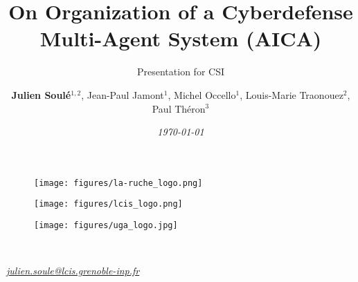 \author{
    \textbf{Julien Soulé}$^{1,2}$, Jean-Paul Jamont$^{1}$, Michel Occello$^{1}$, Louis-Marie Traonouez$^{2}$, Paul Théron$^{3}$
}

\title{\textbf{On Organization of a Cyberdefense Multi-Agent System (AICA)}}

\subtitle{Presentation for CSI}




\date{\textit{\footnotesize \today}}

\begin{frame}[plain]
    \maketitle\vspace{-0.8cm}
    \begin{figure}[ht!]
        \centering

        \centering
        \begin{minipage}{0.25\textwidth}
            \centering
            
        \end{minipage}\hfill
        \begin{minipage}{0.25\textwidth}
            \centering
            \texttt{[image: figures/la-ruche\_logo.png]}
        \end{minipage}\hfill
        \begin{minipage}{0.25\textwidth}
            \centering
            \texttt{[image: figures/lcis\_logo.png]}
        \end{minipage}\hfill
        \begin{minipage}{0.25\textwidth}
            \centering
            \texttt{[image: figures/uga\_logo.jpg]}
        \end{minipage}

    \end{figure}

    \ \\

    \begin{minipage}{\textwidth}
        \centering
        \textit{\href{mailto:julien.soule@lcis.grenoble-inp.fr}{julien.soule@lcis.grenoble-inp.fr}}
    \end{minipage}


\end{frame}
